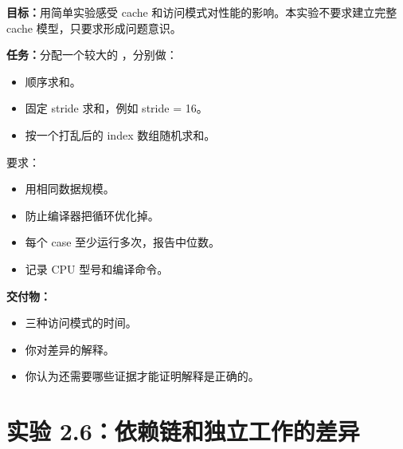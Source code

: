 \begin{labbox}
\textbf{目标：}用简单实验感受 cache 和访问模式对性能的影响。本实验不要求建立完整 cache 模型，只要求形成问题意识。

\textbf{任务：}分配一个较大的 ，分别做：

\begin{itemize}
  \item 顺序求和。
  \item 固定 stride 求和，例如 stride = 16。
  \item 按一个打乱后的 index 数组随机求和。
\end{itemize}

要求：

\begin{itemize}
  \item 用相同数据规模。
  \item 防止编译器把循环优化掉。
  \item 每个 case 至少运行多次，报告中位数。
  \item 记录 CPU 型号和编译命令。
\end{itemize}

\textbf{交付物：}

\begin{itemize}
  \item 三种访问模式的时间。
  \item 你对差异的解释。
  \item 你认为还需要哪些证据才能证明解释是正确的。
\end{itemize}
\end{labbox}

\section{实验 2.6：依赖链和独立工作的差异}


